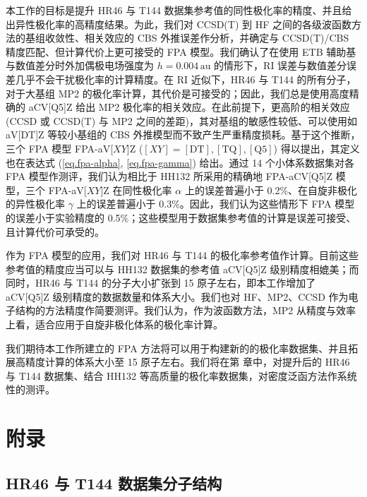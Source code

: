 本工作的目标是提升 HR46 与 T144 数据集参考值的同性极化率的精度、并且给出异性极化率的高精度结果。为此，我们对 CCSD(T) 到 HF 之间的各级波函数方法的基组收敛性、相关效应的 CBS 外推误差作分析，并确定与 CCSD(T)/CBS 精度匹配、但计算代价上更可接受的 FPA 模型。我们确认了在使用 ETB 辅助基与数值差分时外加偶极电场强度为 $h = 0.004 \, \text{au}$ 的情形下，RI 误差与数值差分误差几乎不会干扰极化率的计算精度。在 RI 近似下，HR46 与 T144 的所有分子，对于大基组 MP2 的极化率计算，其代价是可接受的；因此，我们总是使用高度精确的 aCV[Q5]Z 给出 MP2 极化率的相关效应。在此前提下，更高阶的相关效应 (CCSD 或 CCSD(T) 与 MP2 之间的差距)，其对基组的敏感性较低、可以使用如 aV[DT]Z 等较小基组的 CBS 外推模型而不致产生严重精度损耗。基于这个推断，三个 FPA 模型 FPA-aV[$XY$]Z ($[XY] = \mathrm{[DT], [TQ], [Q5]}$) 得以提出，其定义也在表达式 (\ref{eq.fpa-alpha}, \ref{eq.fpa-gamma}) 给出。通过 14 个小体系数据集对各 FPA 模型作测评，我们认为相比于 HH132 所采用的精确地 FPA-aCV[Q5]Z 模型，三个 FPA-aV[$XY$]Z 在同性极化率 $\alpha$ 上的误差普遍小于 0.2\%、在自旋非极化的异性极化率 $\gamma$ 上的误差普遍小于 0.3\%。因此，我们认为这些情形下 FPA 模型的误差小于实验精度的 0.5\%；这些模型用于数据集参考值的计算是误差可接受、且计算代价可承受的。

作为 FPA 模型的应用，我们对 HR46 与 T144 的极化率参考值作计算。目前这些参考值的精度应当可以与 HH132 数据集的参考值 aCV[Q5]Z 级别精度相媲美；而同时，HR46 与 T144 的分子大小扩张到 15 原子左右，即本工作增加了 aCV[Q5]Z 级别精度的数据数量和体系大小。我们也对 HF、MP2、CCSD 作为电子结构的方法精度作简要测评。我们认为，作为波函数方法，MP2 从精度与效率上看，适合应用于自旋非极化体系的极化率计算。

我们期待本工作所建立的 FPA 方法将可以用于构建新的的极化率数据集、并且拓展高精度计算的体系大小至 15 原子左右。我们将在第  章中，对提升后的 HR46 与 T144 数据集、结合 HH132 等高质量的极化率数据集，对密度泛函方法作系统性的测评。

\clearpage

\section{附录}

\subsection{HR46 与 T144 数据集分子结构}

